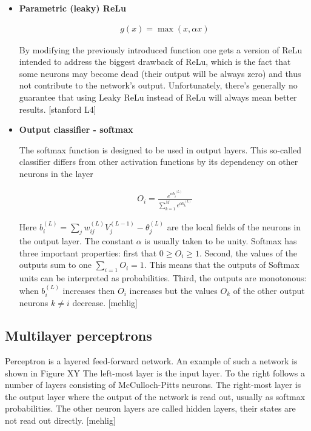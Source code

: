 \begin{itemize}
\item \textbf{Parametric (leaky) ReLu}

\begin{gather}
	g(x)=\max(x,\alpha x)
\end{gather}

By modifying the previously introduced function one gets a version of ReLu intended to address the biggest drawback of ReLu, which is the fact that some neurons may become dead (their output will be always zero) and thus not contribute to the network's output. Unfortunately, there's generally no guarantee that using Leaky ReLu instead of ReLu will always mean better results. [stanford L4]

\item \textbf{Output classifier - softmax}

The softmax function is designed to be used in output layers. This so-called classifier differs from other activation functions by its dependency on other neurons in the layer

\begin{gather}
	O_{i} = \frac{e^{\alpha b_i^{(L)}}}{\sum_{k=1}^{M} e^{\alpha b_k^{(L)}}}
\end{gather}

Here $ b_{i}^{(L)} = \sum_{j}w_{ij}^{(L)} V_{j}^{(L-1)} - \theta _{j}^{(L)} $  are the local fields of the neurons in the output layer. The constant $\alpha$ is usually taken to be unity. Softmax has three important properties: first that 
$ 0 \geq O_i \geq 1 $. Second, the values of the outputs sum to one $ \sum_{i=1} O_i = 1 $. This means that the outputs of Softmax units can be interpreted as probabilities. Third, the outputs are monotonous: when $ b_i^{(L)} $ increases then $ O_i $ increases but the values $ O_k $ of the other output neurons $ k \neq i $ decrease. [mehlig]

\end{itemize}

\subsection{Multilayer perceptrons}

Perceptron is a layered feed-forward network. An example of such a network is shown in Figure XY The left-most layer is the input layer. To the right follows a number of layers consisting of McCulloch-Pitts neurons. The right-most layer is the output layer where the output of the network is read out, usually as softmax probabilities. The other neuron layers are called hidden layers, their states are not read out directly. [mehlig]

